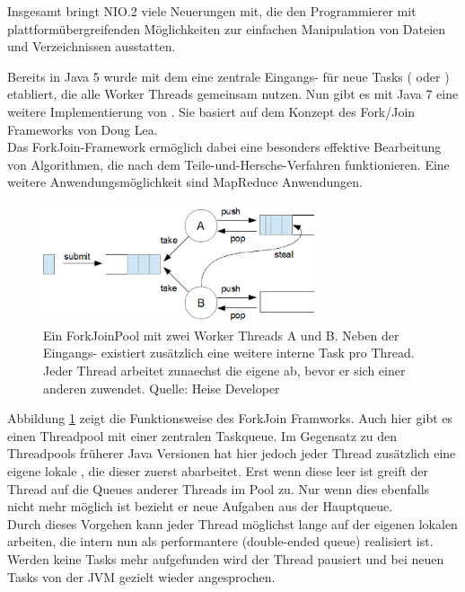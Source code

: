 \documentclass[times, 10pt,twocolumn]{article}
\begin{document}
Insgesamt bringt NIO.2 viele Neuerungen mit, die den Programmierer mit plattformübergreifenden Möglichkeiten zur einfachen
Manipulation von Dateien und Verzeichnissen ausstatten. 

Bereits in Java 5 wurde mit dem  eine zentrale Eingangs- für neue Tasks ( oder ) etabliert, die alle Worker Threads gemeinsam nutzen. Nun gibt es mit Java 7 eine weitere Implementierung von . Sie basiert auf dem Konzept des Fork/Join Frameworks\cite{forkjoinpaper} von Doug Lea.\cite{forkjoinheise}\\

Das ForkJoin-Framework ermöglich dabei eine besonders effektive Bearbeitung von Algorithmen, die nach dem Teile-und-Hersche-Verfahren funktionieren. Eine weitere Anwendungsmöglichkeit sind MapReduce Anwendungen.\\

\begin{figure}[h!]
\includegraphics[width=8cm]{../images/forkjoin.png}
\caption[Fork/Join Image.]{Ein ForkJoinPool mit zwei Worker Threads A und B. Neben der Eingangs- existiert zusätzlich eine weitere interne Task  pro Thread. Jeder Thread arbeitet zunaechst die eigene  ab, bevor er sich einer anderen zuwendet. Quelle: Heise Developer\cite{forkjoinheise}}
\label{forkjoinpic}
\end{figure}

Abbildung \ref{forkjoinpic} zeigt die Funktionsweise des ForkJoin Framworks. Auch hier gibt es einen Threadpool mit einer zentralen Taskqueue. Im Gegensatz zu den Threadpools früherer Java Versionen hat hier jedoch jeder Thread zusätzlich eine eigene lokale , die dieser zuerst abarbeitet. Erst wenn diese leer ist greift der Thread auf die Queues anderer Threads im Pool zu. Nur wenn dies ebenfalls nicht mehr möglich ist bezieht er neue Aufgaben aus der Hauptqueue.\\

Durch dieses Vorgehen kann jeder Thread möglichst lange auf der eigenen lokalen  arbeiten, die intern nun als performantere  (double-ended queue) realisiert ist. Werden keine Tasks mehr aufgefunden wird der Thread pausiert und bei neuen Tasks von der JVM gezielt wieder angesprochen.\cite{forkjoinheise}\\
\end{document}

